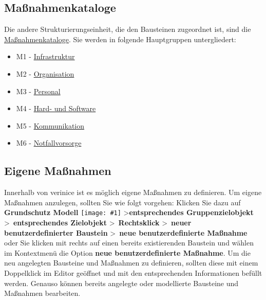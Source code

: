 \documentclass[a4paper,10pt]{book}
\newcommand{\icon}[1]{\texttt{[image: \#1]}}
\begin{document}
\subsection{Maßnahmenkataloge}
Die andere Strukturierungseinheit, die den Bausteinen zugeordnet ist, sind die \href{https://www.bsi.bund.de/cln_156/DE/Themen/weitereThemen/ITGrundschutzKataloge/Inhalt/Massnahmenkataloge/massnahmenkataloge_node.html}{Maßnahmenkataloge}. Sie werden in folgende Hauptgruppen untergliedert:
\begin{itemize}
\item M1 - \href{https://www.bsi.bund.de/cln_156/DE/Themen/weitereThemen/ITGrundschutzKataloge/Inhalt/Massnahmenkataloge/M1Infrastruktur/m1infrastruktur_node.html}{Infrastruktur}
\item M2 - \href{https://www.bsi.bund.de/cln_156/DE/Themen/weitereThemen/ITGrundschutzKataloge/Inhalt/Massnahmenkataloge/M2Organisation/m2organisation_node.html}{Organisation}
\item M3 - \href{https://www.bsi.bund.de/cln_156/DE/Themen/weitereThemen/ITGrundschutzKataloge/Inhalt/Massnahmenkataloge/M3Personal/m3personal_node.html}{Personal}
\item M4 - \href{https://www.bsi.bund.de/cln_156/DE/Themen/weitereThemen/ITGrundschutzKataloge/Inhalt/Massnahmenkataloge/M4HardwareundSoftware/m4hardwareundsoftware_node.html}{Hard- und Software}
\item M5 - \href{https://www.bsi.bund.de/cln_156/DE/Themen/weitereThemen/ITGrundschutzKataloge/Inhalt/Massnahmenkataloge/M5Kommunikation/m5kommunikation_node.html}{Kommunikation}
\item M6 - \href{https://www.bsi.bund.de/cln_156/DE/Themen/weitereThemen/ITGrundschutzKataloge/Inhalt/Massnahmenkataloge/M6Notfallversorgung/m6notfallvorsorge_node.html}{Notfallvorsorge}
\end{itemize}

\subsection{Eigene Maßnahmen}
Innerhalb von verinice ist es möglich eigene Maßnahmen zu definieren. Um eigene Maßnahmen anzulegen, sollten Sie wie folgt vorgehen:
Klicken Sie dazu auf \textbf{Grundschutz Modell} \icon{Icon/GS_Modell.png} \textgreater \textbf{entsprechendes Gruppenzielobjekt}
\textgreater\ \textbf{entsprechendes Zielobjekt} \textgreater\ \textbf{Rechtsklick} \textgreater\ \textbf{neuer benutzerdefinierter Baustein} \textgreater\
\textbf{neue benutzerdefinierte Maßnahme} oder Sie klicken mit rechts auf einen bereits existierenden Baustein und wählen im Kontextmenü
die Option \textbf{neue benutzerdefinierte Maßnahme}.
Um die neu angelegten Bausteine und Maßnahmen zu definieren, sollten diese mit einem Doppelklick im Editor geöffnet und mit den entsprechenden
Informationen befüllt werden. Genauso können bereits angelegte oder modellierte Bausteine und Maßnahmen bearbeiten.
\end{document}

